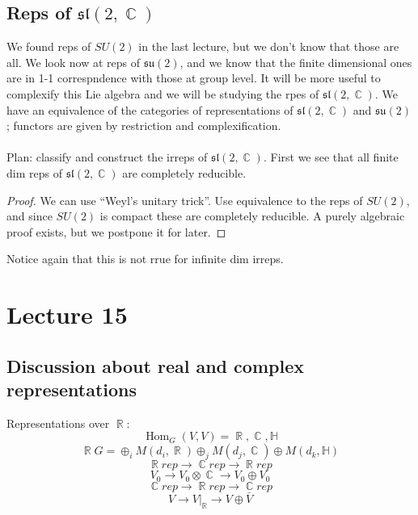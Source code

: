 \documentclass[12 pt]{article}
\DeclareMathOperator {\R} {\mathbb{R}}
\DeclareMathOperator {\C} {\mathbb{C}}
\DeclareMathOperator {\Hom} {Hom}
\newcommand {\HH} {\mathbb{H}}
\theoremstyle{plain}
\theoremstyle{definition}
\theoremstyle{remark}
\begin{document}
\subsection*{Reps of $\mathfrak{sl} (2,\C)$}
We found reps of $SU(2)$ in the last lecture, but we don't know that those are all. We look now at reps of $\mathfrak{su}(2)$, and we know that the finite dimensional ones are in 1-1 correspndence with those at group level. It will be more useful to complexify this Lie algebra and we will be studying the rpes of $\mathfrak{sl}(2,\C)$. We have an equivalence of the categories of representations of $\mathfrak{sl}(2,\C)$ and $\mathfrak{su}(2)$; functors are given by restriction and complexification.
\\
\\
Plan: classify and construct the irreps of $\mathfrak{sl}(2,\C)$. First we see that all finite dim reps of $\mathfrak{sl}(2,\C)$ are completely reducible.
\begin{proof}
We can use ``Weyl's unitary trick''. Use equivalence to the reps of $SU(2)$, and since $SU(2)$ is compact these are completely reducible. A purely algebraic proof exists, but we postpone it for later.
\end{proof}
Notice again that this is not rrue for infinite dim irreps.

\section*{Lecture 15}
\subsection*{Discussion about real and complex representations}
Representations over $\R$:
\[     \Hom_G (V,V) = \R, \C, \HH     \]
\[     \R G = \oplus_i M(d_i, \R) \oplus_j M(d_j, \C) \oplus M(d_k, \HH)    \]
\[          \R rep \longrightarrow \C rep \longrightarrow \R rep        \]
\[         V_0 \to V_0 \otimes \C \to V_0 \oplus V_0      \]
\[    \C rep \longrightarrow \R rep \longrightarrow  \C rep      \]
\[       V \to V|_{\R} \to V \oplus \bar V     \]
\end{document}
